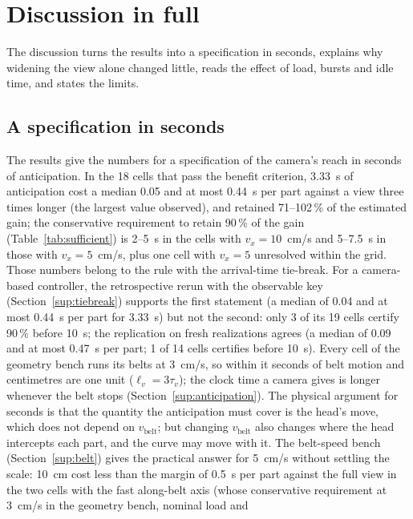 \documentclass[11pt,a4paper]{article}
\newcommand{\tv}{\tau_{v}}
\newcommand{\lv}{\ell_{v}}
\newcommand{\vb}{v_{\mathrm{belt}}}
\begin{document}

\section{Discussion in full}\label{sup:discussion}

The discussion turns the results into a specification in seconds, explains why widening the view alone changed little, reads the effect of load, bursts and idle time, and states the limits.

\subsection{A specification in seconds}
The results give the numbers for a specification of the camera's reach in seconds of
anticipation. In the 18 cells that pass the benefit criterion, 3.33~s of anticipation cost
a median 0.05 and at most 0.44~s per part against a view three times longer (the largest
value observed), and retained 71--102\,\% of the estimated gain; the conservative
requirement to retain 90\,\% of the gain (Table~\ref{tab:sufficient}) is 2--5~s in the
cells with $v_x=10$~cm/s and 5--7.5~s in those with $v_x=5$~cm/s, plus one cell with
$v_x=5$ unresolved within the grid. Those numbers belong to the rule with the
arrival-time tie-break. For a camera-based controller, the retrospective rerun with the
observable key (Section~\ref{sup:tiebreak}) supports the first statement (a median of
0.04 and at most 0.44~s per part for 3.33~s) but not the second: only 3 of its 19 cells
certify 90\,\% before 10~s; the replication on fresh realizations agrees (a median of 0.09
and at most 0.47~s per part; 1 of 14 cells certifies before 10~s). Every cell of the geometry bench runs its belts at 3~cm/s, so
within it seconds of belt motion and centimetres are one unit ($\lv=3\tv$); the clock time a
camera gives is longer whenever the belt stops (Section~\ref{sup:anticipation}). The physical argument
for seconds is that the quantity the anticipation must cover is the head's move, which
does not depend on $\vb$; but changing $\vb$ also changes where the head intercepts each
part, and the curve may move with it. The belt-speed bench (Section~\ref{sup:belt}) gives
the practical answer for 5~cm/s without settling the scale: 10~cm cost less than the
margin of 0.5~s per part against the full view in the two cells with the fast along-belt
axis (whose conservative requirement at 3~cm/s in the geometry bench, nominal load and
\end{document}
